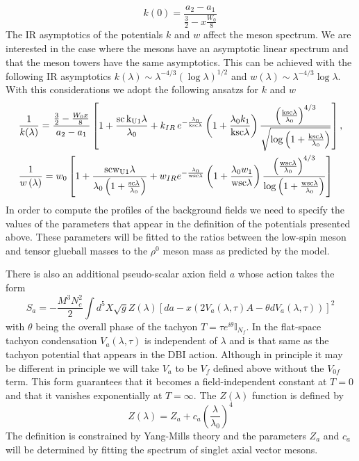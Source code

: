 \documentclass[a4paper,12pt]{article}
\begin{document}
\begin{equation}
k(0) = \frac{a_2 - a_1}{ \frac{3}{2} - x \frac{W_0}{8} }
\end{equation}
The IR asymptotics of the potentials $k$ and $w$ affect the meson spectrum. We are interested in the case where the mesons have an asymptotic linear spectrum and that the meson towers have the same asymptotics. This can be achieved with the following IR asymptotics $k(\lambda) \sim \lambda^{-4/3} {\left(\log \lambda\right)}^{1/2}$ and $w(\lambda) \sim \lambda^{-4/3} \log \lambda$. With this considerations we adopt the following ansatzs for $k$ and $w$
\begin{align}
& \frac{1}{k(\lambda)} =  \frac{ \frac{3}{2} - \frac{W_0 x}{8}}{a_2 - a_1} \left[ 1+ \frac{\rm{sc} \, k_{U1} \lambda}{\lambda_0} + k_{IR} \, e^{-\frac{\lambda_0}{\rm{ksc} \lambda}} \left( 1 + \frac{\lambda_0 k_1}{\rm{ksc} \lambda}\right) \frac{{\left(\frac{\rm{ksc} \lambda}{\lambda_0}\right)}^{4/3}}{\sqrt{\log\left(1 + \frac{\rm{ksc} \lambda}{\lambda_0}\right)}}\right], \\
& \frac{1}{w\left(\lambda\right)} = w_0 \left[1 + \frac{\rm{sc} w_{U1} \lambda}{\lambda_0 \left( 1+ \frac{\rm{sc} \lambda}{\lambda_0}\right)} + w_{IR} e^{- \frac{\lambda_0}{\rm{wsc} \lambda}} \left(1+\frac{\lambda_0 w_1}{\rm{wsc} \lambda}\right)\frac{{\left( \frac{\rm{wsc} \lambda}{\lambda_0}\right)}^{4/3}}{\log\left(1+\frac{\rm{wsc} \lambda}{\lambda_0}\right)} \right]
\end{align}
In order to compute the profiles of the background fields we need to specify the values of the parameters that appear in the definition of the potentials presented above. These parameters will be fitted to the ratios between the low-spin meson and tensor glueball masses to the $\rho^0$ meson mass as predicted by the model.

There is also an additional pseudo-scalar axion field $a$ whose action takes the form
\begin{equation}
\label{eq:axion_action}
S_a = - \frac{M^3 N_c^2}{2} \int d^5 X \sqrt{g} Z(\lambda) [ d a - x (2 V_a(\lambda, \tau) A - \theta d V_a (\lambda, \tau))]^2
\end{equation}
with $\theta$ being the overall phase of the tachyon $T = \tau e^{i \theta} \mathbb{I}_{N_f}$. In the flat-space tachyon condensation $V_a(\lambda, \tau)$ is independent of $\lambda$ and is that same as the tachyon potential that appears in the DBI action. Although in principle it may be different in principle we will take $V_a$ to be $V_f$ defined above without the $V_{0f}$ term. This form guarantees that it becomes a field-independent constant at $T=0$ and that it vanishes exponentially at $T = \infty$.
The $Z(\lambda)$ function is defined by
\begin{equation}
Z(\lambda) = Z_a + c_a {\left(\frac{\lambda}{\lambda_0}\right)}^4
\label{eq:Z_func_def}
\end{equation}
The definition is constrained by Yang-Mills theory and the parameters $Z_a$ and $c_a$ will be determined by fitting the spectrum of singlet axial vector mesons.
\end{document}
